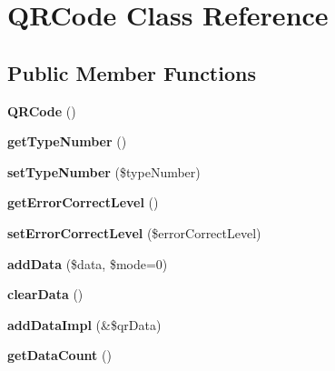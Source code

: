 \hypertarget{class_q_r_code}{}\section{Q\+R\+Code Class Reference}
\label{class_q_r_code}
\subsection*{Public Member Functions}
\begin{DoxyCompactItemize}
\item 
\mbox{\label{class_q_r_code_ad3f026f46b80982eea6adff491c632ef}} 
{\bfseries Q\+R\+Code} ()
\item 
\mbox{\label{class_q_r_code_a98f3f7e14776e1f1fed8efa210eedb5a}} 
{\bfseries get\+Type\+Number} ()
\item 
\mbox{\label{class_q_r_code_a89d27508b1cc10be998c1aef0c9063b1}} 
{\bfseries set\+Type\+Number} (\$type\+Number)
\item 
\mbox{\label{class_q_r_code_a8d89cb04f5b03e22f8a3bfa9d8c4a2b8}} 
{\bfseries get\+Error\+Correct\+Level} ()
\item 
\mbox{\label{class_q_r_code_a3f0566d1217e9851f81f1cec65564f0a}} 
{\bfseries set\+Error\+Correct\+Level} (\$error\+Correct\+Level)
\item 
\mbox{\label{class_q_r_code_a4580f1138742812817eea99e168a30dd}} 
{\bfseries add\+Data} (\$data, \$mode=0)
\item 
\mbox{\label{class_q_r_code_aa206850fec0a358ff454728193a6379e}} 
{\bfseries clear\+Data} ()
\item 
\mbox{\label{class_q_r_code_a639c3bfd7a030858713a8d57158968c7}} 
{\bfseries add\+Data\+Impl} (\&\$qr\+Data)
\item 
\mbox{\label{class_q_r_code_aa330dc32ba13adea3168b37e59014079}} 
{\bfseries get\+Data\+Count} ()
\item 
\mbox{\label{class_q_r_code_afb8f7451a42d195f057cadb8206d1115}} 

\end{DoxyCompactItemize}
